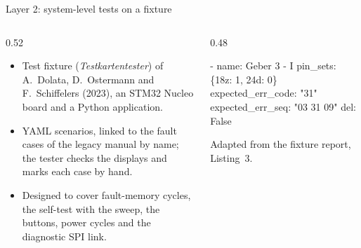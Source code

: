 \begin{frame}[fragile]{Layer 2: system-level tests on a fixture}
  \begin{columns}[T]
    \begin{column}{0.52\textwidth}
      \begin{itemize}\small
        \item Test fixture (\emph{Testkartentester}) of A.~Dolata, D.~Ostermann and F.~Schiffelers (2023), an STM32 Nucleo board and a Python application.
        \item YAML scenarios, linked to the fault cases of the legacy manual by name; the tester checks the displays and marks each case by hand.
        \item Designed to cover fault-memory cycles, the self-test with the sweep, the buttons, power cycles and the diagnostic SPI link.
      \end{itemize}
    \end{column}
    \begin{column}{0.48\textwidth}
      \scriptsize
      \begin{semiverbatim}
- name: Geber 3 - I
  pin_sets: \{18z: 1, 24d: 0\}
  expected_err_code: "31"
  expected_err_seq: "03 31 09"
  del: False
      \end{semiverbatim}
      \tiny Adapted from the fixture report, Listing~3.
    \end{column}
  \end{columns}
\end{frame}

